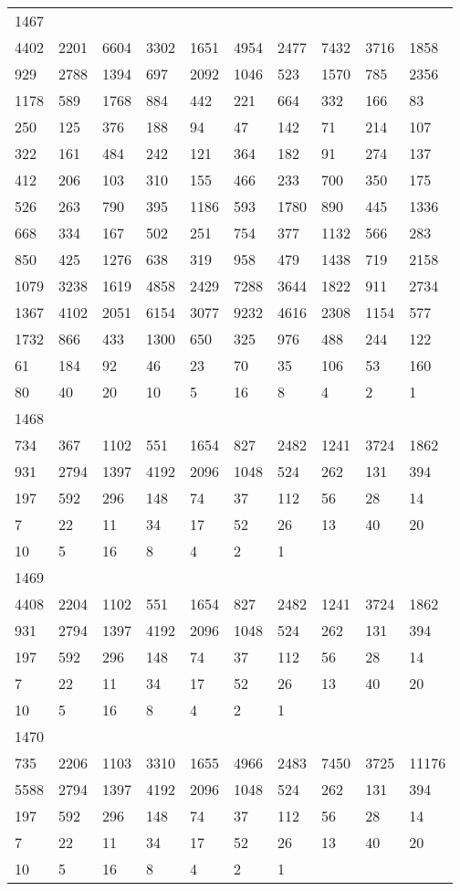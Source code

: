 \begin{longtable}{*{10}{l}}
1467&&&&&&&&&\\
4402& 2201& 6604& 3302& 1651& 4954& 2477& 7432& 3716& 1858\\
929& 2788& 1394& 697& 2092& 1046& 523& 1570& 785& 2356\\
1178& 589& 1768& 884& 442& 221& 664& 332& 166& 83\\
250& 125& 376& 188& 94& 47& 142& 71& 214& 107\\
322& 161& 484& 242& 121& 364& 182& 91& 274& 137\\
412& 206& 103& 310& 155& 466& 233& 700& 350& 175\\
526& 263& 790& 395& 1186& 593& 1780& 890& 445& 1336\\
668& 334& 167& 502& 251& 754& 377& 1132& 566& 283\\
850& 425& 1276& 638& 319& 958& 479& 1438& 719& 2158\\
1079& 3238& 1619& 4858& 2429& 7288& 3644& 1822& 911& 2734\\
1367& 4102& 2051& 6154& 3077& 9232& 4616& 2308& 1154& 577\\
1732& 866& 433& 1300& 650& 325& 976& 488& 244& 122\\
61& 184& 92& 46& 23& 70& 35& 106& 53& 160\\
80& 40& 20& 10& 5& 16& 8& 4& 2& 1\\

1468&&&&&&&&&\\
734& 367& 1102& 551& 1654& 827& 2482& 1241& 3724& 1862\\
931& 2794& 1397& 4192& 2096& 1048& 524& 262& 131& 394\\
197& 592& 296& 148& 74& 37& 112& 56& 28& 14\\
7& 22& 11& 34& 17& 52& 26& 13& 40& 20\\
10& 5& 16& 8& 4& 2& 1& \\

1469&&&&&&&&&\\
4408& 2204& 1102& 551& 1654& 827& 2482& 1241& 3724& 1862\\
931& 2794& 1397& 4192& 2096& 1048& 524& 262& 131& 394\\
197& 592& 296& 148& 74& 37& 112& 56& 28& 14\\
7& 22& 11& 34& 17& 52& 26& 13& 40& 20\\
10& 5& 16& 8& 4& 2& 1& \\

1470&&&&&&&&&\\
735& 2206& 1103& 3310& 1655& 4966& 2483& 7450& 3725& 11176\\
5588& 2794& 1397& 4192& 2096& 1048& 524& 262& 131& 394\\
197& 592& 296& 148& 74& 37& 112& 56& 28& 14\\
7& 22& 11& 34& 17& 52& 26& 13& 40& 20\\
10& 5& 16& 8& 4& 2& 1& \\


\end{longtable}
